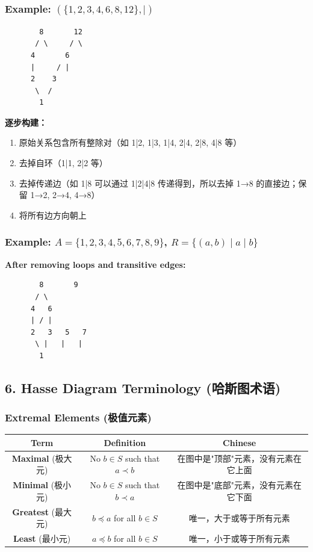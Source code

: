 \documentclass[10pt,a4paper,openany]{ctexbook}
\theoremstyle{definition}
\theoremstyle{remark}
\begin{document}
\subsubsection{Example: $(\{1,2,3,4,6,8,12\}, \mid)$}

{\footnotesize\begin{verbatim}
        8       12
       / \     / \
      4       6
      |     / |
      2    3
       \  /
        1
\end{verbatim}}

\textbf{逐步构建：}
\begin{enumerate}
\item 原始关系包含所有整除对（如 1|2, 1|3, 1|4, 2|4, 2|8, 4|8 等）
\item 去掉自环（1|1, 2|2 等）
\item 去掉传递边（如 1|8 可以通过 1|2|4|8 传递得到，所以去掉 1→8 的直接边；保留 1→2, 2→4, 4→8）
\item 将所有边方向朝上

\end{enumerate}

\subsubsection{Example: $A = \{1,2,3,4,5,6,7,8,9\}$, $R = \{(a,b) \mid a \mid b\}$}

\textbf{After removing loops and transitive edges:}
{\footnotesize\begin{verbatim}
        8       9
       / \
      4   6
      | / |
      2   3   5   7
       \ |   |   |
        1
\end{verbatim}}

\vspace{-2pt}

\subsection{6. Hasse Diagram Terminology (哈斯图术语)}

\subsubsection{Extremal Elements (极值元素)}

\begin{center}
\begin{tabular}{ccc}
\hline
Term & Definition & Chinese \\ \hline
\textbf{Maximal} (极大元) & No $b \in S$ such that $a \prec b$ & 在图中是"顶部"元素，没有元素在它上面 \\
\textbf{Minimal} (极小元) & No $b \in S$ such that $b \prec a$ & 在图中是"底部"元素，没有元素在它下面 \\
\textbf{Greatest} (最大元) & $b \preccurlyeq a$ for all $b \in S$ & 唯一，大于或等于所有元素 \\
\textbf{Least} (最小元) & $a \preccurlyeq b$ for all $b \in S$ & 唯一，小于或等于所有元素 \\
\hline
\end{tabular}

\end{center}
\end{document}
